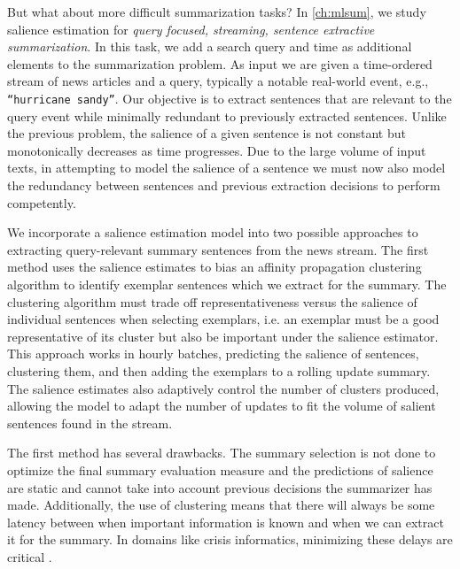But what about more difficult summarization tasks? In \autoref{ch:mlsum}, we
study salience estimation for \emph{query focused, streaming, sentence
extractive summarization}. In this task, we add a search query and time as
additional elements to the summarization problem. As input we are given a
time-ordered stream of news articles and a query, typically a notable
real-world event, e.g., \texttt{``hurricane sandy''}. Our objective is to
extract sentences that are relevant to the query event while minimally
redundant to previously extracted sentences. Unlike the previous problem, the
salience of a given sentence is not constant but monotonically decreases as
time progresses. Due to the large volume of input texts, in attempting to model
the salience of a sentence we must now also model the redundancy between
sentences and previous extraction decisions to perform competently.
      
We incorporate a salience estimation model into two possible approaches to
extracting query-relevant summary sentences from the news stream.  The first
method uses the salience estimates to bias an affinity propagation clustering
algorithm \citep{dueck2009} to identify exemplar sentences which we extract for
the summary.  The clustering algorithm must trade off representativeness versus
the salience of individual sentences when selecting exemplars, i.e. an exemplar
must be a good representative of its cluster but also be important under the
salience estimator.  This approach works in hourly batches, predicting the
salience of sentences, clustering them, and then adding the exemplars to a
rolling update summary. The salience estimates also adaptively control the
number of clusters produced, allowing the model to adapt the number of updates
to fit the volume of salient sentences found in the stream. 

The first method has several drawbacks. The summary selection is not done to
optimize the final summary evaluation measure and the predictions of salience
are static and cannot take into account previous decisions the summarizer has
made. Additionally, the use of clustering means that there will always be some
latency between when important information is known and when we can extract it
for the summary. In domains like crisis informatics, minimizing these delays
are critical \citep{starbird2013}.

